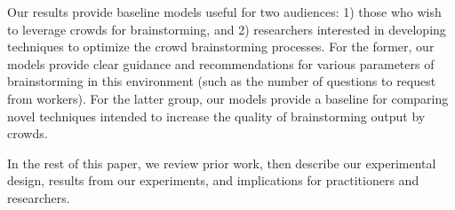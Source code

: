 Our results provide baseline models useful for two audiences: 1) those who wish to leverage crowds for brainstorming, and 2) researchers interested in developing techniques to optimize the crowd brainstorming processes. For the former, our models provide clear guidance and recommendations for various parameters of brainstorming in this environment (such as the number of questions to request from workers). For the latter group, our models provide a baseline for comparing novel techniques intended to increase the quality of brainstorming output by crowds.




In the rest of this paper, we review prior work, then describe our experimental design, results from our experiments, and implications for practitioners and researchers.
